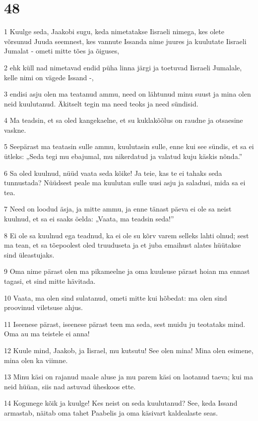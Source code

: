 \chapter{48}

\par 1 Kuulge seda, Jaakobi sugu, keda nimetatakse Iisraeli nimega, kes olete võrsunud Juuda seemnest, kes vannute Issanda nime juures ja kuulutate Iisraeli Jumalat - ometi mitte tões ja õiguses,
\par 2 ehk küll nad nimetavad endid püha linna järgi ja toetuvad Iisraeli Jumalale, kelle nimi on vägede Issand -,
\par 3 endisi asju olen ma teatanud ammu, need on lähtunud minu suust ja mina olen neid kuulutanud. Äkitselt tegin ma need teoks ja need sündisid.
\par 4 Ma teadsin, et sa oled kangekaelne, et su kuklakõõlus on raudne ja otsaesine vaskne.
\par 5 Seepärast ma teatasin sulle ammu, kuulutasin sulle, enne kui see sündis, et sa ei ütleks: „Seda tegi mu ebajumal, mu nikerdatud ja valatud kuju käskis nõnda.”
\par 6 Sa oled kuulnud, nüüd vaata seda kõike! Ja teie, kas te ei tahaks seda tunnustada? Nüüdsest peale ma kuulutan sulle uusi asju ja saladusi, mida sa ei tea.
\par 7 Need on loodud äsja, ja mitte ammu, ja enne tänast päeva ei ole sa neist kuulnud, et sa ei saaks öelda: „Vaata, ma teadsin seda!”
\par 8 Ei ole sa kuulnud ega teadnud, ka ei ole su kõrv varem selleks lahti olnud; sest ma tean, et sa tõepoolest oled truuduseta ja et juba emaihust alates hüütakse sind üleastujaks.
\par 9 Oma nime pärast olen ma pikameelne ja oma kuulsuse pärast hoian ma ennast tagasi, et sind mitte hävitada.
\par 10 Vaata, ma olen sind sulatanud, ometi mitte kui hõbedat: ma olen sind proovinud viletsuse ahjus.
\par 11 Iseenese pärast, iseenese pärast teen ma seda, sest muidu ju teotataks mind. Oma au ma teistele ei anna!
\par 12 Kuule mind, Jaakob, ja Iisrael, mu kutsutu! See olen mina! Mina olen esimene, mina olen ka viimne.
\par 13 Minu käsi on rajanud maale aluse ja mu parem käsi on laotanud taeva; kui ma neid hüüan, siis nad astuvad üheskoos ette.
\par 14 Kogunege kõik ja kuulge! Kes neist on seda kuulutanud? See, keda Issand armastab, näitab oma tahet Paabelis ja oma käsivart kaldealaste seas.
